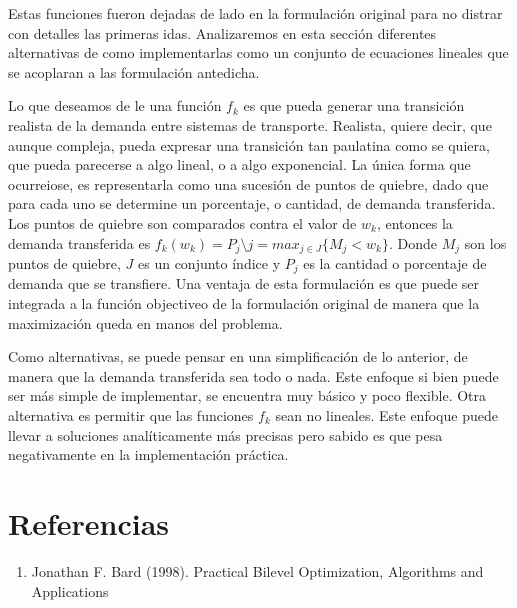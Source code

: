 \documentclass{article}
\begin{document}
  Estas funciones fueron dejadas de lado en la formulación original para no distrar con detalles las primeras idas. Analizaremos en esta sección diferentes alternativas de como implementarlas como un conjunto de ecuaciones lineales que se acoplaran a las formulación antedicha.

  Lo que deseamos de le una función $f_k$ es que pueda generar una transición realista de la demanda entre sistemas de transporte. Realista, quiere decir, que aunque compleja, pueda expresar una transición tan paulatina como se quiera, que pueda parecerse a algo lineal, o a algo exponencial. La única forma que ocurreiose, es representarla como una sucesión de puntos de quiebre, dado que para cada uno se determine un porcentaje, o cantidad, de demanda transferida. Los puntos de quiebre son comparados contra el valor de $w_k$, entonces la demanda transferida es $f_k(w_k) = P_j \setminus j = max_{j \in J} \{M_j < w_k\}$. Donde $M_j$ son los puntos de quiebre, $J$ es un conjunto índice y $P_j$ es la cantidad o porcentaje de demanda que se transfiere. Una ventaja de esta formulación es que puede ser integrada a la función objectiveo de la formulación original de manera que la maximización queda en manos del problema.

  Como alternativas, se puede pensar en una simplificación de lo anterior, de manera que la demanda transferida sea todo o nada. Este enfoque si bien puede ser más simple de implementar, se encuentra muy básico y poco flexible. Otra alternativa es permitir que las funciones $f_k$ sean no lineales. Este enfoque puede llevar a soluciones analíticamente más precisas pero sabido es que pesa negativamente en la implementación práctica.

  \section*{Referencias}

  \begin{enumerate}
    \item{\label{bardbook} Jonathan F. Bard (1998). Practical Bilevel Optimization, Algorithms and Applications}
  \end{enumerate}
\end{document}
